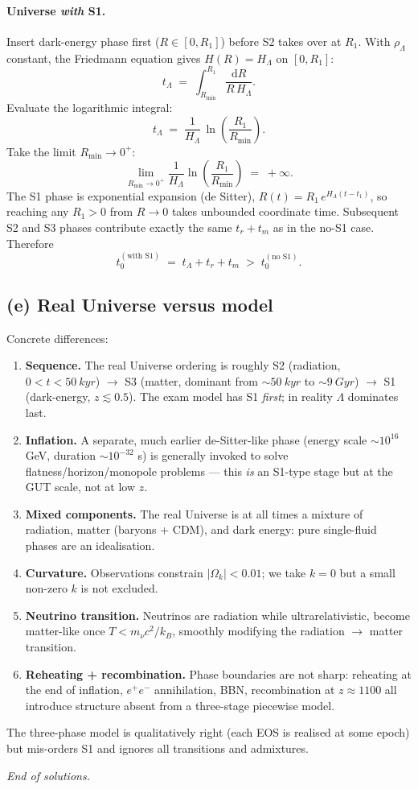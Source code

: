 \documentclass[11pt]{article}
\newcommand{\de}{\mathrm{d}}
\newcommand{\kB}{k_{B}}
\begin{document}
\paragraph{Universe \emph{with} S1.}
Insert dark-energy phase first ($R\in[0,R_1]$) before S2 takes over at $R_1$. With $\rho_\Lambda$ constant, the Friedmann equation gives $H(R)=H_\Lambda$ on $[0,R_1]$:
\[
t_\Lambda \;=\; \int_{R_{\min}}^{R_1}\frac{\de R}{R\,H_\Lambda}.
\]
Evaluate the logarithmic integral:
\[
t_\Lambda \;=\; \frac{1}{H_\Lambda}\,\ln\!\left(\frac{R_1}{R_{\min}}\right).
\]
Take the limit $R_{\min}\to 0^+$:
\[
\lim_{R_{\min}\to 0^+}\frac{1}{H_\Lambda}\ln\!\left(\frac{R_1}{R_{\min}}\right) \;=\; +\infty.
\]
The S1 phase is exponential expansion (de Sitter), $R(t)=R_1\,e^{H_\Lambda(t-t_1)}$, so reaching any $R_1>0$ from $R\to 0$ takes unbounded coordinate time. Subsequent S2 and S3 phases contribute exactly the same $t_r+t_m$ as in the no-S1 case. Therefore
\begin{equation}
\boxed{\;t_0^{(\text{with S1})} \;=\; t_\Lambda + t_r + t_m \;>\; t_0^{(\text{no S1})}.\;}
\label{eq:older}
\end{equation}

\subsection*{(e) Real Universe versus model}

Concrete differences:
\begin{enumerate}\itemsep0pt
\item \textbf{Sequence.} The real Universe ordering is roughly S2 (radiation, $0<t<\SI{50}{kyr}$) $\to$ S3 (matter, dominant from $\sim\SI{50}{kyr}$ to $\sim\SI{9}{Gyr}$) $\to$ S1 (dark-energy, $z\lesssim 0.5$). The exam model has S1 \emph{first}; in reality $\Lambda$ dominates last.
\item \textbf{Inflation.} A separate, much earlier de-Sitter-like phase (energy scale $\sim 10^{16}$ GeV, duration $\sim 10^{-32}$ s) is generally invoked to solve flatness/horizon/monopole problems --- this \emph{is} an S1-type stage but at the GUT scale, not at low $z$.
\item \textbf{Mixed components.} The real Universe is at all times a mixture of radiation, matter (baryons + CDM), and dark energy: pure single-fluid phases are an idealisation.
\item \textbf{Curvature.} Observations constrain $|\Omega_k|<0.01$; we take $k=0$ but a small non-zero $k$ is not excluded.
\item \textbf{Neutrino transition.} Neutrinos are radiation while ultrarelativistic, become matter-like once $T<m_\nu c^2/\kB$, smoothly modifying the radiation $\to$ matter transition.
\item \textbf{Reheating + recombination.} Phase boundaries are not sharp: reheating at the end of inflation, $e^+e^-$ annihilation, BBN, recombination at $z\approx 1100$ all introduce structure absent from a three-stage piecewise model.
\end{enumerate}
The three-phase model is qualitatively right (each EOS is realised at some epoch) but mis-orders S1 and ignores all transitions and admixtures.

\bigskip\noindent\emph{End of solutions.}
\end{document}
